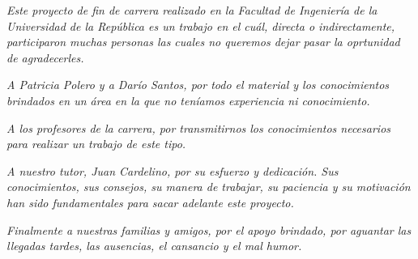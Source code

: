 \textit{Este proyecto de fin de carrera realizado en la Facultad de Ingeniería de la Universidad de la República es un trabajo en el cuál, directa o indirectamente, participaron muchas personas las cuales no queremos dejar pasar la oprtunidad de agradecerles.}

\vspace{3 mm}

\textit{A Patricia Polero y a Darío Santos, por todo el material y los conocimientos brindados en un área en la que no teníamos experiencia ni conocimiento.}

\vspace{3 mm}

\textit{A los profesores de la carrera, por transmitirnos los conocimientos necesarios para realizar un trabajo de este tipo.}

\vspace{3 mm}

\textit{A nuestro tutor, Juan Cardelino, por su esfuerzo y dedicación. Sus conocimientos, sus consejos, su manera de trabajar, su paciencia y su motivación han sido fundamentales para sacar adelante este proyecto.}

\vspace{3 mm}

\textit{Finalmente a nuestras familias y amigos, por el apoyo brindado, por aguantar las llegadas tardes, las ausencias, el cansancio y el mal humor.}